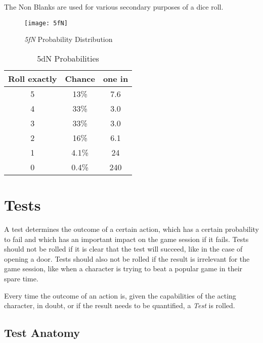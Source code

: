The Non Blanks are used for various secondary purposes of a dice roll.

\begin{figure}[htb]
    \caption{\emph{5fN} Probability Distribution}
    \texttt{[image: 5fN]}
\end{figure}

\begin{table}[htb]
    \caption[5dN Probabilities]{5dN Probabilities}
    \label{tab:5dN probabilities}
    \centering
    \begin{tabular}{ccc}
        \toprule
        \textbf{Roll exactly} & \textbf{Chance} & \textbf{one in} \\
        \midrule
        5                     & 13\%            & 7.6             \\
        4                     & 33\%            & 3.0             \\
        3                     & 33\%            & 3.0             \\
        2                     & 16\%            & 6.1             \\
        1                     & 4.1\%           & 24              \\
        0                     & 0.4\%           & 240             \\
        \bottomrule
    \end{tabular}
\end{table}

\section{Tests}

A test determines the outcome of a certain action, which has a certain probability to
fail and which has an important impact on the game session if it fails. Tests should
not be rolled if it is clear that the test will succeed, like in the case of opening
a door. Tests should also not be rolled if the result is irrelevant for the game
session, like when a character is trying to beat a popular game in their spare time.

Every time the outcome of an action is, given the capabilities of the acting
character, in doubt, or if the result needs to be quantified, a \emph{Test} is rolled.

\subsection{Test Anatomy}

